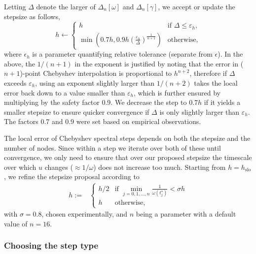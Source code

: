 \documentclass[10pt]{article}
\newcommand{\be}{\begin{equation}}
\newcommand{\ee}{\end{equation}}
\newcommand{\eps}{\epsilon}
\newcommand{\om}{\omega}
\newcommand{\g}{\gamma}
\begin{document}
Letting $\Delta$ denote the larger of $\Delta_n[\om]$ and $\Delta_n[\g]$, we accept or update the stepsize as follows,
\be
    h \leftarrow \begin{cases}
        h &\text{if } \Delta \leq \varepsilon_h, \\
        \min \left( 0.7h, 0.9 h \left( \frac{\varepsilon_h}{\Delta} \right)^{\frac{1}{n+1}} \right) &\text{otherwise},
    \end{cases}
    \ee
where $\eps_h$ is a parameter quantifying relative tolerance (separate from $\eps$). In the above, the $1/(n+1)$ in the exponent is justified by noting that the
error in ($n+1$)-point Chebyshev interpolation is proportional to $h^{n+2}$, therefore if
$\Delta$ exceeds $\varepsilon_h$, using an exponent slightly larger than $1/(n+2)$ takes
the local error back down to a value smaller than $\varepsilon_h$, which is further
ensured by multiplying by the safety factor 0.9. We decrease the step to $0.7h$
if it yields a smaller stepsize to ensure quicker convergence if $\Delta$ is
only slightly larger than $\varepsilon_h$. The factors 0.7 and 0.9 were set based on
empirical observations. 

The local error of Chebyshev spectral steps depends on both the stepsize and
the number of nodes. Since within a step we iterate over both of these until
convergence, we only need to ensure that over our proposed stepsize the
timescale over which $u$ changes ($\approx 1/\om$) does not increase too much. Starting from $h =
h_{\text{slo}}$, we refine the stepsize proposal according to
\begin{align}
    h :=& \begin{cases}
        h/2 &\text{if } \min\limits_{j = 0, 1, \ldots, n}\frac{1}{\om(t^{\star}_j)} < \sigma h \\
        h &\text{otherwise},
    \end{cases}
\end{align}
with $\sigma = 0.8$, chosen experimentally, and $n$ being a
parameter with a default value of $n = 16$.

\subsubsection{Choosing the step type}
\label{steptype}
\end{document}

